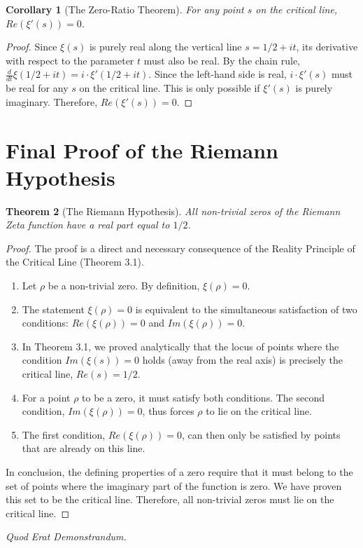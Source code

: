 \documentclass{article}
\newtheorem{theorem}{Theorem}[section]
\newtheorem{corollary}[theorem]{Corollary}
\begin{document}
\begin{corollary}[The Zero-Ratio Theorem]
For any point $s$ on the critical line, $Re(\xi'(s))=0$.
\end{corollary}
\begin{proof}
Since $\xi(s)$ is purely real along the vertical line $s=1/2+it$, its derivative with respect to the parameter $t$ must also be real. By the chain rule, $\frac{d}{dt}\xi(1/2+it) = i \cdot \xi'(1/2+it)$. Since the left-hand side is real, $i \cdot \xi'(s)$ must be real for any $s$ on the critical line. This is only possible if $\xi'(s)$ is purely imaginary. Therefore, $Re(\xi'(s))=0$.
\end{proof}

\section{Final Proof of the Riemann Hypothesis}

\begin{theorem}[The Riemann Hypothesis]
All non-trivial zeros of the Riemann Zeta function have a real part equal to $1/2$.
\end{theorem}

\begin{proof}
The proof is a direct and necessary consequence of the Reality Principle of the Critical Line (Theorem 3.1).
\begin{enumerate}
    \item Let $\rho$ be a non-trivial zero. By definition, $\xi(\rho) = 0$.
    \item The statement $\xi(\rho)=0$ is equivalent to the simultaneous satisfaction of two conditions: $Re(\xi(\rho))=0$ and $Im(\xi(\rho))=0$.
    \item In Theorem 3.1, we proved analytically that the locus of points where the condition $Im(\xi(s)) = 0$ holds (away from the real axis) is precisely the critical line, $Re(s)=1/2$.
    \item For a point $\rho$ to be a zero, it must satisfy both conditions. The second condition, $Im(\xi(\rho)) = 0$, thus forces $\rho$ to lie on the critical line.
    \item The first condition, $Re(\xi(\rho))=0$, can then only be satisfied by points that are already on this line.
\end{enumerate}
In conclusion, the defining properties of a zero require that it must belong to the set of points where the imaginary part of the function is zero. We have proven this set to be the critical line. Therefore, all non-trivial zeros must lie on the critical line.
\end{proof}
\begin{center}
    \textit{Quod Erat Demonstrandum.}
\end{center}
\end{document}

